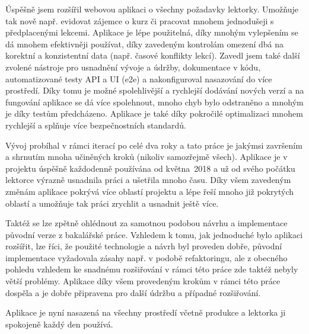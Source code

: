 Úspěšně jsem rozšířil webovou aplikaci o všechny požadavky lektorky. Umožňuje tak nově např. evidovat zájemce o kurz či pracovat mnohem jednodušeji s předplacenými lekcemi. Aplikace je lépe použitelná, díky mnohým vylepšením se dá mnohem efektivněji používat, díky zavedeným kontrolám omezení dbá na korektní a konzistentní data (např. časové konflikty lekcí). Zavedl jsem také další zvolené nástroje pro usnadnění vývoje a údržby, dokumentace v kódu, automatizované testy API a UI (e2e) a nakonfiguroval nasazování do více prostředí. Díky tomu je možné spolehlivější a rychlejší dodávání nových verzí a na fungování aplikace se dá více spolehnout, mnoho chyb bylo odstraněno a mnohým je díky testům předcházeno. Aplikace je také díky pokročilé optimalizaci mnohem rychlejší a splňuje více bezpečnostních standardů.

Vývoj probíhal v rámci iterací po celé dva roky a tato práce je jakýmsi završením a shrnutím mnoha učiněných kroků (nikoliv samozřejmě všech). Aplikace je v projektu úspěšně každodenně používána od května~2018 a už od svého počátku lektorce výrazně usnadnila práci a ušetřila mnoho času. Díky všem zavedeným změnám aplikace pokrývá více oblastí projektu a lépe řeší mnoho již pokrytých oblastí a umožňuje tak práci zrychlit a usnadnit ještě více.

Taktéž se lze zpětně ohlédnout za samotnou podobou návrhu a implementace původní verze z bakalářské práce. Vzhledem k tomu, jak jednoduché bylo aplikaci rozšířit, lze říci, že použité technologie a návrh byl proveden dobře, původní implementace vyžadovala zásahy např. v podobě refaktoringu, ale z obecného pohledu vzhledem ke snadnému rozšiřování v rámci této práce zde taktéž nebyly větší problémy. Aplikace díky všem provedeným krokům v rámci této práce dospěla a je dobře připravena pro další údržbu a případné rozšiřování.

Aplikace je nyní nasazená na všechny prostředí včetně produkce a lektorka ji spokojeně každý den používá. 
